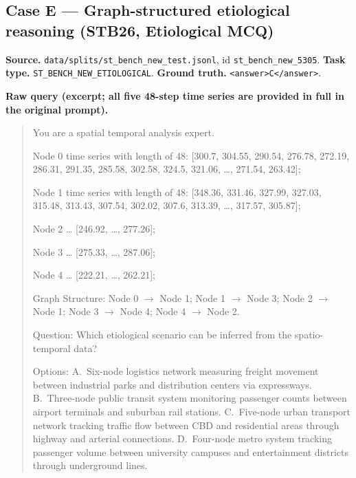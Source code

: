 \subsection{Case E --- Graph-structured etiological reasoning (STB26, Etiological MCQ)}
\label{app:case_e}

\textbf{Source.} \texttt{data/splits/st\_bench\_new\_test.jsonl}, id \texttt{st\_bench\_new\_5305}.
\textbf{Task type.} \texttt{ST\_BENCH\_NEW\_ETIOLOGICAL}.
\textbf{Ground truth.} \texttt{<answer>C</answer>}.

\textbf{Raw query (excerpt; all five 48-step time series are provided in full in the original prompt).}
\begin{quote}\small\ttfamily
You are a spatial temporal analysis expert.

Node 0 time series with length of 48: [300.7, 304.55, 290.54, 276.78, 272.19, 286.31, 291.35, 285.58, 302.58, 324.5, 321.06, \ldots, 271.54, 263.42];

Node 1 time series with length of 48: [348.36, 331.46, 327.99, 327.03, 315.48, 313.43, 307.54, 302.02, 307.6, 313.39, \ldots, 317.57, 305.87];

Node 2 \ldots{} [246.92, \ldots, 277.26];

Node 3 \ldots{} [275.33, \ldots, 287.06];

Node 4 \ldots{} [222.21, \ldots, 262.21];

Graph Structure: Node 0 $\to$ Node 1; Node 1 $\to$ Node 3; Node 2 $\to$ Node 1; Node 3 $\to$ Node 4; Node 4 $\to$ Node 2.

Question: Which etiological scenario can be inferred from the spatio-temporal data?

Options:
A.~Six-node logistics network measuring freight movement between industrial parks and distribution centers via expressways.
B.~Three-node public transit system monitoring passenger counts between airport terminals and suburban rail stations.
C.~Five-node urban transport network tracking traffic flow between CBD and residential areas through highway and arterial connections.
D.~Four-node metro system tracking passenger volume between university campuses and entertainment districts through underground lines.
\end{quote}

